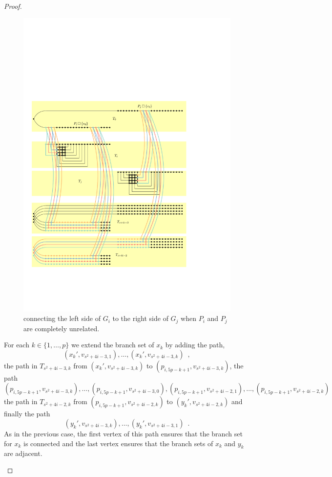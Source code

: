 \documentclass[kpfonts,lotsofwhite]{patmorin}
\theoremstyle{plain}
\theoremstyle{definition}
\begin{document}
\begin{proof}
\begin{itemize}
    \begin{figure}
      \begin{center}
        \includegraphics{figs/reverso}
      \end{center}
      \caption{connecting the left side of $G_i$ to the right side of $G_j$ when $P_i$ and $P_j$ are completely unrelated.}
      \label{reverso}
    \end{figure}

    For each $k\in\{1,\ldots,p\}$ we extend the branch set of $x_k$ by adding the path,
    \[
      (x_k',v_{s^2+4i-3,1}),\ldots,(x_k',v_{s^2+4i-3,k}) \enspace ,
    \]
    the path in $T_{s^2+4i-3,k}$ from  $(x_k',v_{s^2+4i-3,k})$ to $(p_{i,5p-k+1},v_{s^2+4i-3,k})$, the path
    \[
      (p_{i,5p-k+1},v_{s^2+4i-3,k}),\ldots,(p_{i,5p-k+1},v_{s^2+4i-3,0}),(p_{i,5p-k+1},v_{s^2+4i-2,1}),\ldots,(p_{i,5p-k+1},v_{s^2+4i-2,k})
    \]
    the path in $T_{s^2+4i-2,k}$ from $(p_{i,5p-k+1},v_{s^2+4i-2,k})$ to $(y_k',v_{s^2+4i-2,k})$ and finally the path
    \[
      (y_k',v_{s^2+4i-3,k}),\ldots,(y_k',v_{s^2+4i-3,1}) \enspace .
    \]
    As in the previous case, the first vertex of this path ensures that the branch set for $x_k$ is connected and the last vertex ensures that the branch sets of $x_k$ and $y_k$ are adjacent.
  \end{itemize}


\end{proof}
\end{document}
